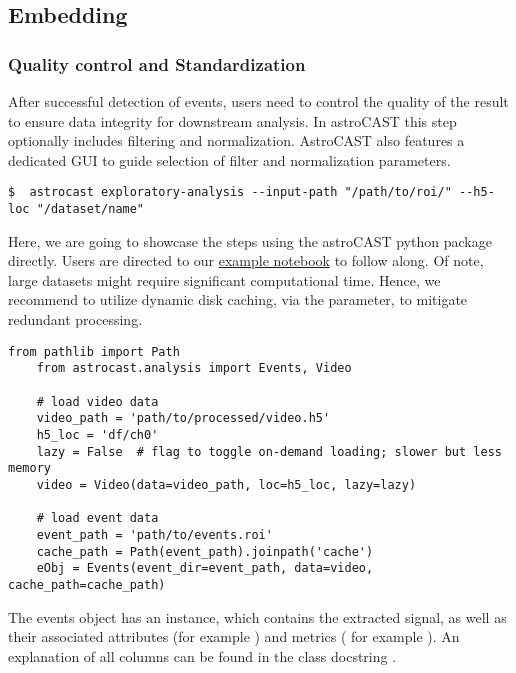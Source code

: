 \subsection{Embedding}\label{subsec:embedding}

\subsubsection{Quality control and Standardization}\label{subsubsec:quality-control}

After successful detection of events, users need to control the quality of the result to ensure data integrity for downstream analysis. In astroCAST this step optionally includes filtering and normalization. AstroCAST also features a dedicated GUI to guide selection of filter and normalization parameters.

\begin{lstlisting}[style=bashStyle]
    $  astrocast exploratory-analysis --input-path "/path/to/roi/" --h5-loc "/dataset/name"
\end{lstlisting}

Here, we are going to showcase the steps using the astroCAST python package directly. Users are directed to our \href{https://github.com/janreising/astroCAST/blob/9a474e5a5e643fa886b3edc5237328ca0a1d2a17/notebooks/examples/B%20-%20embedding.ipynb}{example notebook} to follow along. Of note, large datasets might require significant computational time. Hence, we recommend to utilize dynamic disk caching, via the \inlinepy{cache\_path} parameter, to mitigate redundant processing.

\begin{lstlisting}[style=pyStyle]
    from pathlib import Path
    from astrocast.analysis import Events, Video

    # load video data
    video_path = 'path/to/processed/video.h5'
    h5_loc = 'df/ch0'
    lazy = False  # flag to toggle on-demand loading; slower but less memory
    video = Video(data=video_path, loc=h5_loc, lazy=lazy)

    # load event data
    event_path = 'path/to/events.roi'
    cache_path = Path(event_path).joinpath('cache')
    eObj = Events(event_dir=event_path, data=video, cache_path=cache_path)

\end{lstlisting}

The events object has an  instance, which contains the extracted signal, as well as their associated attributes (for example ) and metrics ( for example ). An explanation of all columns can be found in the class docstring .

